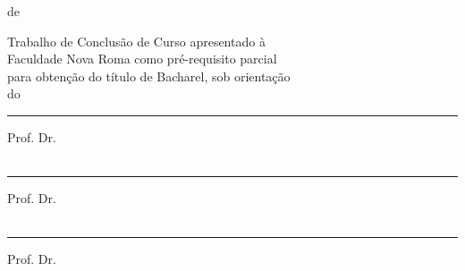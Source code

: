 \documentclass{tcc}
\begin{document}
\vfill
\begin{center}
\MONTH de \the\year
\end{center}

\newpage
\begin{center}
\Large{\bf \MakeUppercase{\theauthor}}
\end{center}
\vspace{3in}
\begin{center}
\LARGE{\bf \thetitle}
\end{center}

\vspace{0.05in}

\begin{flushright}
Trabalho de Conclusão de Curso apresentado à\\ Faculdade Nova Roma como pré-requisito parcial\\ para obtenção do título de Bacharel, sob orientação\\ do \orientador
\end{flushright}

\vspace{0.7in}

\hrule
\noindent Prof. Dr. \profa\\
\insta\\

\vspace{0.25in}

\hrule
\noindent Prof. Dr. \profb\\
\instb\\

\vspace{0.25in}

\hrule
\noindent Prof. Dr. \profc\\
\instc\\


\newpage



\newpage



\newpage

\renewcommand{\listfigurename}{\centering LISTA DE FIGURAS}
\listoffigures
\newpage

\renewcommand{\listtablename}{\centering LISTA DE TABELAS}
\listoftables
\newpage



\newpage


\pagestyle{plain} %
\tableofcontents

\newpage










\nocite{*}
 

\end{document}
